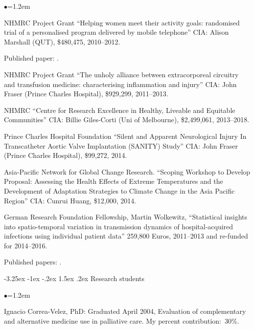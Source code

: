 \documentclass[a4paper,11pt]{article}
\makeatletter
\renewcommand\subsection{\@startsection{subsection}{2}{\z@}%
                                       {-3.25ex \@plus -1ex \@minus -.2ex}%
                                       {1.5ex \@plus .2ex}%
                                   {\normalfont\normalsize\bfseries\color{blue}}}
\renewcommand{\labelitemi}{$\bullet$}
\makeatother
\begin{document}
\begin{raggedright}
\begin{list}{\labelitemi}{\leftmargin=1.2em}
\item NHMRC Project Grant ``Helping women meet their activity goals: randomised trial of a personalised program delivered by mobile telephone'' CIA: Alison Marshall (QUT), \$480,475, 2010--2012.

    Published paper: .

\item NHMRC Project Grant ``The unholy alliance between extracorporeal circuitry and transfusion medicine: characterising inflammation and injury'' CIA: John Fraser (Prince Charles Hospital), \$929,299, 2011--2013.

\item NHMRC ``Centre for Research Excellence in Healthy, Liveable and Equitable Communities'' CIA: Billie Giles-Corti (Uni of Melbourne), \$2,499,061, 2013--2018.

\item Prince Charles Hospital Foundation ``Silent and Apparent Neurological Injury In Transcatheter Aortic Valve Implantation (SANITY) Study'' CIA: John Fraser (Prince Charles Hospital), \$99,272, 2014.

\item Asia-Pacific Network for Global Change Research. ``Scoping Workshop to Develop Proposal: Assessing the Health Effects of Extreme Temperatures and the Development of Adaptation Strategies to Climate Change in the Asia Pacific Region'' CIA: Cunrui Huang, \$12,000, 2014.

\item German Research Foundation Fellowship, Martin Wolkewitz, ``Statistical insights into spatio-temporal variation in transmission dynamics of hospital-acquired infections using individual patient data'' 259,800
Euros, 2011--2013 and re-funded for 2014--2016.

    Published papers: .


\end{list}

\subsection{Research students}

\begin{list}{\labelitemi}{\leftmargin=1.2em}\addtolength{\itemsep}{-0.5\baselineskip}
\item Ignacio Correa-Velez, PhD: Graduated April 2004, Evaluation of complementary and alternative medicine use in palliative care. My percent contribution:~30\%.


\end{list}
\end{raggedright}
\end{document}
